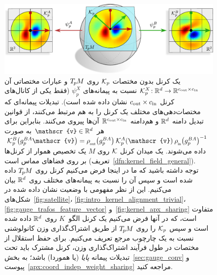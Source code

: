 \begin{figure}[H]
	\centering
	\includegraphics[width=.9\columnwidth]{figures/kernel_coordinatization.pdf}
	\caption{\small
		یک کرنل بدون مختصات $\mathcal{K}_p$ روی $T_{\mkern-1.5mu p}\mkern-.5muM$ و عبارات مختصاتی آن ${\mathcal{K}_p^X \!: \mathbb{R}^d \to \mathbb{R}^{{c_\textup{out}}\times{c_\textup{in}}}}$ نسبت به پیمانه‌های $\psi_p^X$ (فقط یکی از کانال‌های کرنل ${{c_\textup{out}} \times {c_\textup{in}}}$ نشان داده شده است).
		تبدیلات پیمانه‌ای که مختصات‌دهی‌های مختلف یک کرنل را به هم مرتبط می‌کنند، از قوانین تبدیل دامنه $\mathbb{R}^d$ و هم‌دامنه $\mathbb{R}^{{c_\textup{out}}\times{c_\textup{in}}}$ آن‌ها پیروی می‌کنند.
		بنابراین برای هر $\mathscr{v} \in \R^d$ به صورت
		$\Kp^B\big(g_p^{BA} \mathscr{v}\big) = \rhoout\big(g_p^{BA}\big) \:\Kp^A (\mathscr{v})\: \rhoin\big(g_p^{BA}\big)^{-1}$ داده می‌شوند.
		یک میدان کرنل $\mathcal{K}$ روی $M$ یک تخصیص هموار از کرنل‌ها بر روی فضاهای مماس است (تعریف~\ref{dfn:kernel_field_general}).
		\\
		توجه داشته باشید که ما در اینجا فرض می‌کنیم کرنل روی $T_{\mkern-1.5mu p}\mkern-.5muM$ داده شده است و سپس آن را نسبت به پیمانه‌های مختلف روی $\mathbb{R}^d$ بیان می‌کنیم.
		این از نظر مفهومی با وضعیت نشان داده شده در
		شکل‌های~\ref{fig:satellite}، \ref{fig:intro_kernel_alignment_trivial}، \ref{fig:gauge_trafos_feature_vector} و~\ref{fig:kernel_apx_sharing} متفاوت است،
		که در آنها فرض می‌کنیم یک کرنل الگو~$K$ روی $\mathbb{R}^d$ داده شده است و سپس $\mathcal{K}_p$ را روی $T_{\mkern-1.5mu p}\mkern-.5muM$ از طریق اشتراک‌گذاری وزن کانولوشنی نسبت به یک چارچوب مرجع تعریف می‌کنیم.
		برای حفظ استقلال از مختصات در طول فرآیند اشتراک‌گذاری وزن، کرنل مشترک باید تحت تبدیلات پیمانه \emph{پایا} (یا هموردا) باشد؛ به بخش~\ref{sec:gauge_conv} و پیوست~\ref{apx:coord_indep_weight_sharing} مراجعه کنید.
	}
	\label{fig:kernel_coordinatization}
\end{figure}

